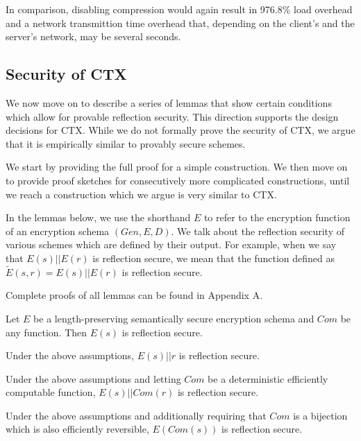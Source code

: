 In comparison, disabling compression would again result in 976.8\% load overhead
and a network transmittion time overhead that, depending on the client's and the
server's network, may be several seconds.

\subsection{Security of CTX}

We now move on to describe a series of lemmas that show certain conditions
which allow for provable reflection security. This direction supports
the design decisions for CTX. While we do not formally prove the security of
CTX, we argue that it is empirically similar to provably secure schemes.

We start by providing the full proof for a simple construction. We then move on
to provide proof sketches for consecutively more complicated constructions,
until we reach a construction which we argue is very similar to CTX.

In the lemmas below, we use the shorthand $E$ to refer to the encryption
function of an encryption schema $(Gen, E, D)$. We talk about the reflection
security of various schemes which are defined by their output. For example,
when we say that $E(s) || E(r)$ is reflection secure, we mean that the function
defined as $\widetilde{E}(s, r) = E(s) || E(r)$ is reflection secure.

Complete proofs of all lemmas can be found in Appendix A.

\begin{lemma}
    Let $E$ be a length-preserving semantically secure encryption schema and
    $Com$ be any function. Then $E(s)$ is reflection secure.
\end{lemma}

\begin{lemma}
    Under the above assumptions, $E(s) || r$ is reflection secure.
\end{lemma}

\begin{lemma}
    Under the above assumptions and letting $Com$ be a deterministic
    efficiently computable function, $E(s) || Com(r)$ is reflection secure.
\end{lemma}

\begin{lemma}
    Under the above assumptions and additionally requiring that $Com$ is a
    bijection which is also efficiently reversible, $E(Com(s))$ is reflection secure.
\end{lemma}

